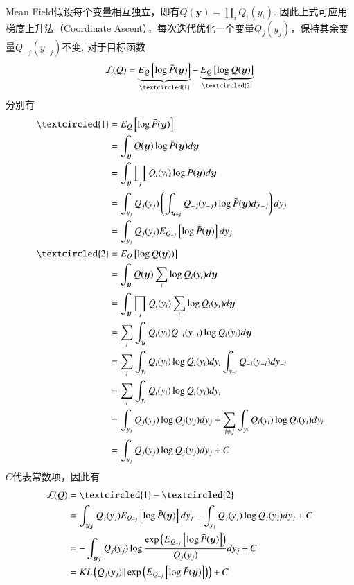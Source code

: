 Mean Field假设每个变量相互独立，即有$Q(\boldsymbol{y})=\prod_i{Q_i(y_i)}$. 因此上式可应用梯度上升法（Coordinate Ascent），每次迭代优化一个变量$Q_j(y_j)$，保持其余变量$Q_{-j}(y_{-j})$不变. 对于目标函数
\begin{equation}
  \mathcal{L}(Q)=\underbrace{E_{Q}\left[\log \tilde{P}(\boldsymbol{y})\right]}_{\textcircled{1}}-\underbrace{E_{Q}\left[\log Q(\boldsymbol{y})\right]}_{\textcircled{2}}
\end{equation}
分别有
\begin{equation}
  \begin{split}
    \textcircled{1}&=E_{Q}\left[\log \tilde{ P}(\boldsymbol{y})\right]\\
    &=\int_{\boldsymbol{y}}Q(\boldsymbol{y}) \log \tilde{P}(\boldsymbol{y})d\boldsymbol{y}\\
    &=\int_{\boldsymbol{y}}\prod_i{Q_i(y_i)} \log \tilde{P}(\boldsymbol{y})d\boldsymbol{y}\\
    &=\int_{y_j}Q_j(y_j)\left(\int_{\boldsymbol{y_{-j}}}Q_{-j}(y_{-j})\log \tilde{ P}(\boldsymbol{y}) dy_{-j}\right) dy_j\\
    &=\int_{y_j}Q_j(y_j)E_{Q_{-j}}\left[\log \tilde{ P}(\boldsymbol{y}) \right] dy_j\\
    \textcircled{2}&=E_{Q}\left[\log Q(\boldsymbol{y}))\right]\\
    &=\int_{\boldsymbol{y}}Q(\boldsymbol{y}) \sum_i\log Q_i(y_i) d\boldsymbol{y}\\
    &=\int_{\boldsymbol{y}}\prod_i{Q_i(y_i)} \sum_i\log Q_i(y_i) d\boldsymbol{y}\\
    &=\sum_i\int_{\boldsymbol{y}}Q_i(y_i)Q_{-i}(y_{-i})\log Q_i(y_i) d\boldsymbol{y}\\
    &=\sum_i\int_{y_i}Q_i(y_i)\log Q_i(y_i) dy_i\int_{y_{-i}} {Q_{-i}(y_{-i})}dy_{-i}\\
    &=\sum_i\int_{y_i}Q_i(y_i)\log Q_i(y_i) dy_i\\
    &=\int_{y_j}Q_j(y_j)\log Q_j(y_j) dy_j + \sum_{i\neq j}\int_{y_i}Q_i(y_i)\log Q_i(y_i) dy_i  \\
    &=\int_{y_j}Q_j(y_j)\log Q_j(y_j) dy_j + C
  \end{split}
\end{equation}
$C$代表常数项，因此有
\begin{equation}
  \begin{split}
    \mathcal{L}(Q)&=\textcircled{1}-\textcircled{2}\\
    &=\int_{\boldsymbol{y_j}}Q_j(y_j)E_{Q_{-j}}\left[\log \tilde{P}(\boldsymbol{y}) \right] dy_j-\int_{y_j}Q_j(y_j)\log Q_j(y_j) dy_j +C\\
    &=-\int_{\boldsymbol{y_j}}Q_j(y_j)\log\frac{\exp\left(E_{Q_{-j}}\left[\log \tilde{P}(\boldsymbol{y}) \right]\right)}{Q_j(y_j)} dy_j +C\\
    &=KL\left(Q_j(y_j)\|\exp\left(E_{Q_{-j}}\left[\log \tilde{P}(\boldsymbol{y}) \right]\right)\right)+C
  \end{split}
\end{equation}
